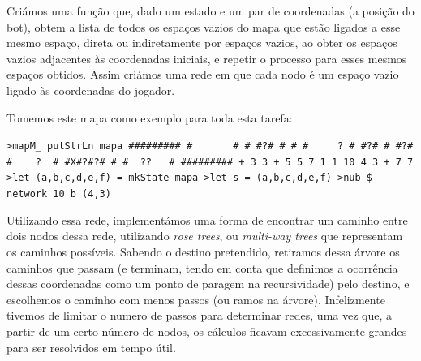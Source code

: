 \documentclass[a4paper]{article}
\begin{document}
    Criámos uma função que, dado um estado e um par de coordenadas (a posição do bot), obtem a lista de todos os espaços vazios do mapa que estão ligados a esse mesmo espaço, direta ou indiretamente por espaços vazios, ao obter os espaços vazios adjacentes às coordenadas iniciais, e repetir o processo para esses mesmos espaços obtidos. 
    Assim criámos uma rede em que cada nodo é um espaço vazio ligado às coordenadas do jogador.
    
    Tomemos este mapa como exemplo para toda esta tarefa: \hspace{6cm}  
    \linebreak
    
    \texttt{>mapM\_ putStrLn  mapa
        \linebreak \#\#\#\#\#\#\#\#\#
        \linebreak \# \ \  \ \ \ \ \#
        \linebreak \# \#?\#\ \# \#
        \linebreak \#\ \ \ \ \ ?\ \#
        \linebreak \#?\# \# \#?\#
        \linebreak \#\ \ \ \ ?\ \ \#
        \linebreak \#X\#?\#?\# \#
        \linebreak \# \ ??\ \ \ \#
        \linebreak \#\#\#\#\#\#\#\#\#
        \linebreak + 3 3
        \linebreak + 5 5
         7 1 1 10
         4 3 +
         7 7 
        \linebreak 
        \linebreak
        >let (a,b,c,d,e,f) = mkState mapa \linebreak
        >let s = (a,b,c,d,e,f)            \break
        >nub \$ network 10 b (4,3)        \break
        [(7,3),(7,2),(7,1),(1,2),(1,1),(2,1),(3,1),(4,1),(6,1),(5,1),(5,2),(5,4),\break
        (5,3),(4,5),(3,5),(1,3),(2,3),(3,4),(4,3),(3,3)]
         }
    \linebreak
    
    Utilizando essa rede, implementámos uma forma de encontrar um caminho entre dois nodos dessa rede, utilizando 
    \textit{rose trees}, ou \textit{multi-way trees} que representam os caminhos possíveis. Sabendo o destino
    pretendido, retiramos dessa árvore os caminhos que passam (e terminam, tendo em conta que definimos a ocorrência
    dessas coordenadas como um ponto de paragem na recursividade) pelo destino, e escolhemos o caminho com menos passos
    (ou ramos na árvore). Infelizmente tivemos de limitar o numero de passos para determinar redes, uma vez que, a partir
    de um certo número de nodos, os cálculos ficavam excessivamente grandes para ser resolvidos em tempo útil.
    \linebreak
    
\end{document}
